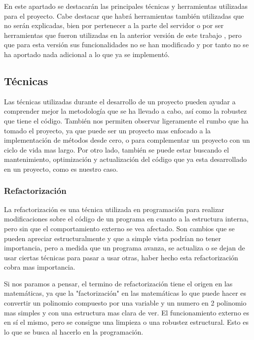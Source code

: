 

En este apartado se destacarán las principales técnicas y herramientas utilizadas para el proyecto. Cabe destacar que habrá herramientas también utilizadas que no serán explicadas, bien por pertenecer a la parte del servidor o por ser herramientas que fueron utilizadas en la anterior versión de este trabajo \cite{tfm1}, pero que para esta versión sus funcionalidades no se han modificado y por tanto no se ha aportado nada adicional a lo que ya se implementó.

\subsection{Técnicas}

Las técnicas utilizadas durante el desarrollo de un proyecto pueden ayudar a comprender mejor la metodología que se ha llevado a cabo, así como la robustez que tiene el código. También nos permiten observar ligeramente el rumbo que ha tomado el proyecto, ya que puede ser un proyecto mas enfocado a la implementación de métodos desde cero, o para complementar un proyecto con un ciclo de vida mas largo. Por otro lado, también se puede estar buscando el mantenimiento, optimización y actualización del código que ya esta desarrollado en un proyecto, como es nuestro caso.

\subsubsection{Refactorización}

La refactorización \cite{refac1} \cite{refac2} es una técnica utilizada en programación para realizar modificaciones sobre el código de un programa en cuanto a la estructura interna, pero sin que el comportamiento externo se vea afectado. Son cambios que se pueden apreciar estructuralmente y que a simple vista podrían no tener importancia, pero a medida que un programa avanza, se actualiza o se dejan de usar ciertas técnicas para pasar a usar otras, haber hecho esta refactorización cobra mas importancia. 

Si nos paramos a pensar, el termino de refactorización tiene el origen en las matemáticas, ya que la "factorización" en las matemáticas lo que puede hacer es convertir un polinomio compuesto por una variable y un numero en 2 polinomio mas simples y con una estructura mas clara de ver. El funcionamiento externo es en sí el mismo, pero se consigue una limpieza o una robustez estructural. Esto es lo que se busca al hacerlo en la programación.

